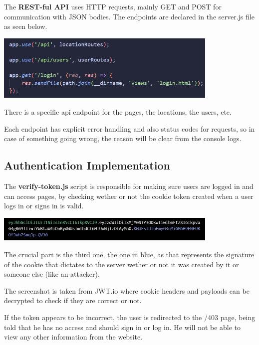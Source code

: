 \documentclass[12pt,a4paper]{report}
\begin{document}
The \textbf{REST-ful API} uses HTTP requests, mainly GET and POST for communication with JSON bodies. The endpoints are declared in the server.js file as seen below.

\begin{center}
\includegraphics[width=0.8\textwidth]{images/api.png}
\end{center}

There is a specific api endpoint for the pages, the locations, the users, etc.

Each endpoint has explicit error handling and also status codes for requests, so in case of something going wrong, the reason will be clear from the console logs.

\subsection{Authentication Implementation}

The \textbf{verify-token.js} script is responsible for making sure users are logged in and can access pages, by checking wether or not the cookie token created when a user logs in or signs in is valid.

\begin{center}
\includegraphics[width=0.8\textwidth]{images/signature.png}
\end{center}

The crucial part is the third one, the one in blue, as that represents the signature of the cookie that dictates to the server wether or not it was created by it or someone else (like an attacker).

The screenshot is taken from JWT.io where cookie headers and payloads can be decrypted to check if they are correct or not.

If the token appears to be incorrect, the user is redirected to the /403 page, being told that he has no access and should sign in or log in. He will not be able to view any other information from the website.
\end{document}
